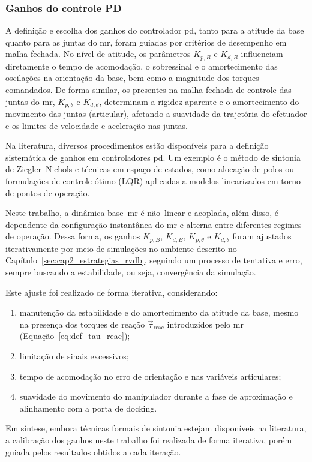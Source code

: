 \subsubsection{Ganhos do controle PD}
\label{sec:controlePD_ganhos}

A definição e escolha dos ganhos do controlador \gls{pd}, tanto para a atitude da base quanto para as juntas do \gls{mr}, foram guiadas por critérios de desempenho em malha fechada.
No nível de atitude, os parâmetros $K_{p,B}$ e $K_{d,B}$ influenciam diretamente o tempo de acomodação, o sobressinal e o amortecimento das oscilações na orientação da base, bem como a magnitude dos torques comandados.
De forma similar, os  presentes na malha fechada de controle das juntas do \gls{mr}, $K_{p,\theta}$ e $K_{d,\theta}$, determinam a rigidez aparente e o amortecimento do movimento das juntas (articular), afetando a suavidade da trajetória do efetuador e os limites de velocidade e aceleração nas juntas.

Na literatura, diversos procedimentos estão disponíveis para a definição sistemática de ganhos em controladores \gls{pd}.
Um exemplo é o método de sintonia de Ziegler--Nichols \cite{ogata2010engenharia} e técnicas em espaço de estados, como alocação de polos ou formulações de controle ótimo (LQR) aplicadas a modelos linearizados em torno de pontos de operação.

Neste trabalho, a dinâmica base--\gls{mr} é não--linear e acoplada, além disso, é dependente da configuração instantânea do \gls{mr} e alterna entre diferentes regimes de operação.
Dessa forma, os ganhos $K_{p,B}$, $K_{d,B}$, $K_{p,\theta}$ e $K_{d,\theta}$ foram ajustados iterativamente por meio de simulações no ambiente descrito no Capítulo~\ref{sec:cap2_estrategias_rvdb}, seguindo um processo de tentativa e erro, sempre buscando a estabilidade, ou seja, convergência da simulação.

Este ajuste foi realizado de forma iterativa, considerando:
\begin{enumerate}[label=(\roman*)]
  \item manutenção da estabilidade e do amortecimento da atitude da base, mesmo na presença dos torques de reação $\vec\tau_{\text{reac}}$ introduzidos pelo \gls{mr} (Equação~\eqref{eq:def_tau_reac});
  \item limitação de sinais excessivos;
  \item tempo de acomodação no erro de orientação e nas variáveis articulares;
  \item suavidade do movimento do manipulador durante a fase de aproximação e alinhamento com a porta de docking.
\end{enumerate}

Em síntese, embora técnicas formais de sintonia estejam disponíveis na literatura, a calibração dos ganhos neste trabalho foi realizada de forma iterativa, porém guiada pelos resultados obtidos a cada iteração.